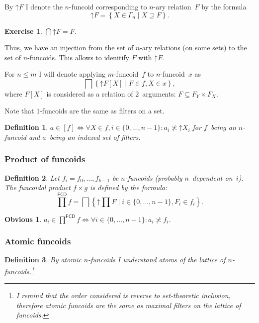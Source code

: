 \documentclass[oneside,draft]{amsart}
\newcommand{\setcond}[2]{\left\{#1\mid#2\right\}}
\newcommand{\intrs}{\not\asymp}
\newcommand{\funcoids}{\mathsf{FCD}}
\newcommand{\suprel}[1]{\left[#1\right]}
\newtheorem{obvious}{Obvious}
\newtheorem{defn}{Definition}
\newtheorem{exer}{Exercise}
\begin{document}
By $\mathord{\uparrow}F$ I denote the $n$-fun\-co\-id corresponding to $n$-ary relation~$F$ by the formula
\[ \mathord{\uparrow}F = \setcond{X\in\Gamma_n}{X\supseteq F}. \]

\begin{exer}
$\bigcap\mathord{\uparrow}F = F$.
\end{exer}

Thus, we have an injection from the set of $n$-ary relations (on some sets) to the set of $n$-fun\-co\-ids.
This allows to idenitify $F$ with $\mathord{\uparrow}F$.

For $n\leq m$ I will denote applying $m$-fun\-co\-id~$f$ to $n$-fun\-co\-id~$x$ as
\[ \bigsqcap\setcond{\mathord{\uparrow} F[X]}{F\in f,X\in x}, \]
where $F[X]$ is considered as a relation of $2$~arguments: $F\subseteq F_Y\times F_X$.

Note that $1$-fun\-co\-ids are the same as filters on a set.

\begin{defn}
$a\in\suprel{f} \Leftrightarrow \forall X\in f, i\in\{0,\dots,n-1\}: a_i \intrs \mathord{\uparrow}X_i$ for $f$~being an $n$-fun\-co\-id and $a$~being an indexed set of filters.
\end{defn}

\subsubsection{Product of funcoids}

\begin{defn}
Let $f_i = f_0,\dots,f_{k-1}$ be $n$-fun\-co\-ids (probably $n$~dependent on~$i$). The \emph{funcoidal product} $f\times g$ is defined by the formula:
\[
\prod^{\funcoids}f = \bigsqcap\setcond{\mathord{\uparrow}\prod F}{i\in\{0,\dots,n-1\}, F_i\in f_i}.
\]
\end{defn}

\begin{obvious}
$a_i\in\prod^{\funcoids}f \Leftrightarrow \forall i\in\{0,\dots,n-1\}: a_i\intrs f_i$.
\end{obvious}

\subsubsection{Atomic funcoids}

\begin{defn}
By \emph{atomic} $n$-fun\-co\-ids I understand atoms of the lattice of $n$-fun\-co\-ids.\footnote{I remind that the order considered is reverse to set-the\-o\-re\-tic inclusion, therefore atomic funcoids are the same as maximal filters on the lattice of funcoids.}
\end{defn}
\end{document}

